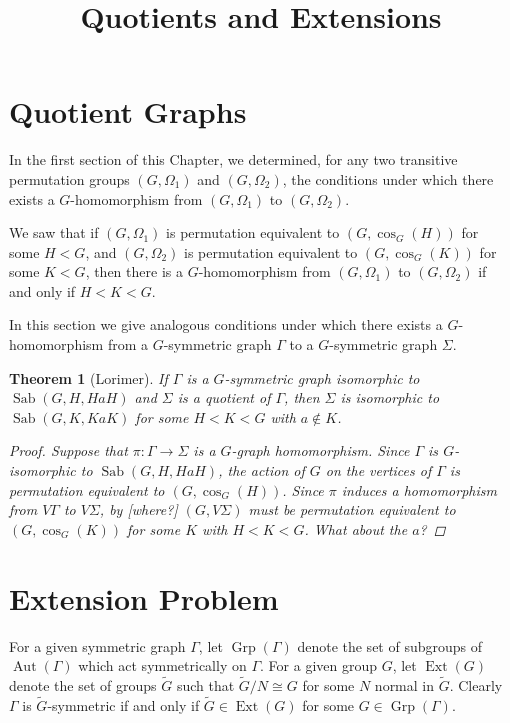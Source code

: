 \documentclass[12pt]{amsart}
\theoremstyle{plain}
\newtheorem{theorem}{Theorem}
\theoremstyle{definition}
\theoremstyle{remark}
\DeclareMathOperator{\Aut}{Aut}
\DeclareMathOperator{\sab}{Sab}
\DeclareMathOperator{\grp}{Grp}
\DeclareMathOperator{\ext}{Ext}
\begin{document}
\title{Quotients and Extensions}
\maketitle



\section{Quotient Graphs}


In the first section of this Chapter,
we determined, for any two transitive permutation groups
$(G, \Omega_1)$ and $(G,\Omega_2)$,
the conditions under which there exists a
$G$-homomorphism from $(G,\Omega_1)$ to $(G,\Omega_2)$.

We saw that if $(G,\Omega_1)$
is permutation equivalent to $(G,\cos_G(H))$
for some $H < G$,
and $(G,\Omega_2)$ is permutation equivalent
to $(G,\cos_G(K))$ for some $K < G$,
then there is a $G$-homomorphism from $(G,\Omega_1)$
to $(G,\Omega_2)$ if and only if $H < K < G$.

In this section we give analogous conditions
under which there exists a $G$-homomorphism
from a $G$-symmetric graph $\Gamma$
to a $G$-symmetric graph $\Sigma$.

\begin{theorem} [Lorimer]
If $\Gamma$ is a $G$-symmetric graph isomorphic to $\sab(G,H,HaH)$
and $\Sigma$ is a quotient of $\Gamma$,
then $\Sigma$ is isomorphic to $\sab(G,K,KaK)$ for some $H < K < G$
with $a \not\in K$.
\begin{proof}
Suppose that $\pi : \Gamma \to \Sigma$ is a $G$-graph homomorphism.
Since $\Gamma$ is $G$-isomorphic to $\sab(G,H,HaH)$,
the action of $G$ on the vertices of $\Gamma$ is permutation
equivalent to $(G,\cos_G(H))$.
Since $\pi$ induces a homomorphism from $V \Gamma$ to $V \Sigma$,
by [where?] $(G,V \Sigma)$
must be permutation equivalent to $(G,\cos_G(K))$
for some $K$ with $H < K < G$.
What about the $a$?
\end{proof}
\end{theorem}

\section{Extension Problem}

For a given symmetric graph $\Gamma$, let $\grp(\Gamma)$ denote
the set of subgroups of $\Aut(\Gamma)$ 
which act symmetrically on $\Gamma$.
For a given group $G$, let $\ext(G)$ denote the set of groups $\widetilde{G}$
such that $\widetilde{G}/N \cong G$ for some $N$ normal in $\widetilde{G}$.
Clearly $\Gamma$ is $\widetilde{G}$-symmetric if and only if
$\widetilde{G} \in \ext(G)$ for some $G \in \grp(\Gamma)$.
\end{document}
